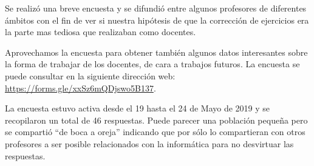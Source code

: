 Se realizó una breve encuesta y se difundió entre algunos profesores de diferentes ámbitos con el fin de ver si nuestra hipótesis de que la corrección de ejercicios era la parte mas tediosa que realizaban como docentes.

\bigskip
Aprovechamos la encuesta para obtener también algunos datos interesantes sobre la forma de trabajar de los docentes, de cara a trabajos futuros. La encuesta se puede consultar en la siguiente dirección web: \url{https://forms.gle/xxSz6mQDjswo5B137}.

\bigskip
La encuesta estuvo activa desde el 19 hasta el 24 de Mayo de 2019 y se recopilaron un total de 46 respuestas. Puede parecer una población pequeña pero se compartió ``de boca a oreja'' indicando que por sólo lo compartieran con otros profesores a ser posible relacionados con la informática para no desvirtuar las respuestas.


